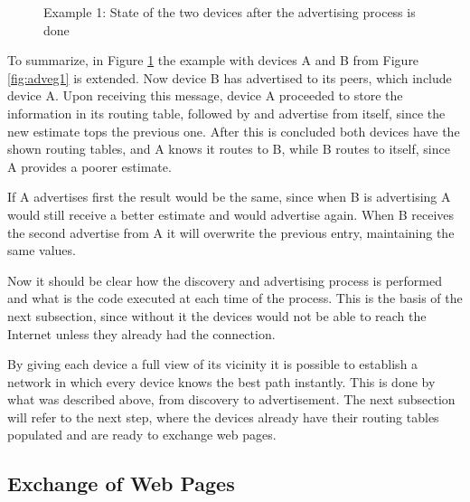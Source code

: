 \begin{figure}[ht]
   \noindent{}
	\caption{\label{fig:adveg2} Example 1: State of the two devices after the advertising process is done} 
\end{figure}

To summarize, in Figure \ref{fig:adveg2} the example with devices A and B from Figure \ref{fig:adveg1} is extended. Now device B has advertised to its peers, which include device A. Upon receiving this message, device A proceeded to store the information in its routing table, followed by and advertise from itself, since the new estimate tops the previous one. After this is concluded both devices have the shown routing tables, and A knows it routes to B, while B routes to itself, since A provides a poorer estimate.

If A advertises first the result would be the same, since when B is advertising A would still receive a better estimate and would advertise again. When B receives the second advertise from A it will overwrite the previous entry, maintaining the same values.

Now it should be clear how the discovery and advertising process is performed and what is the code executed at each time of the process. This is the basis of the next subsection, since without it the devices would not be able to reach the Internet unless they already had the connection.

By giving each device a full view of its vicinity it is possible to establish a network in which every device knows the best path instantly. This is done by what was described above, from discovery to advertisement. The next subsection will refer to the next step, where the devices already have their routing tables populated and are ready to exchange web pages. 

\subsection{Exchange of Web Pages}

